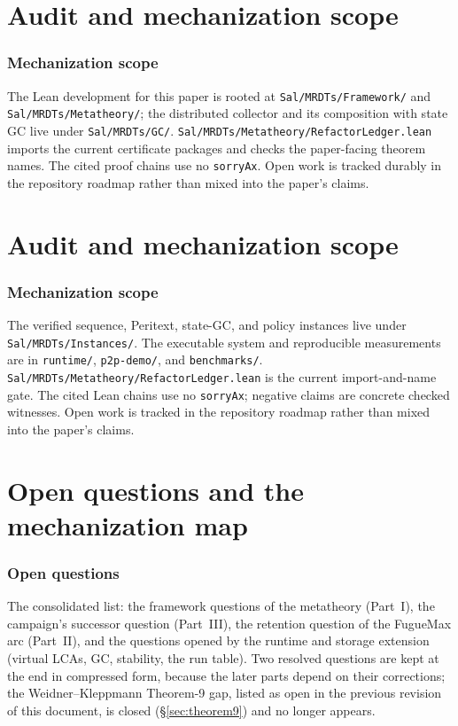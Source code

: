\documentclass[11pt]{article}
\let\salInlinePart\part
\renewcommand{\part}{\clearpage\salInlinePart}
\newcommand{\lean}[1]{\texttt{#1}}
\begin{document}
\part{Audit and mechanization scope}
\section{Mechanization scope}
\label{sec:mech}\label{sec:open}
\label{oq:causalcanon}\label{oq:compose}\label{oq:rcchain}
The Lean development for this paper is rooted at
\lean{Sal/MRDTs/Framework/} and \lean{Sal/MRDTs/Metatheory/}; the distributed
collector and its composition with state GC live under \lean{Sal/MRDTs/GC/}.
\lean{Sal/MRDTs/Metatheory/RefactorLedger.lean} imports the current certificate
packages and checks the paper-facing theorem names. The cited proof chains use
no \lean{sorryAx}. Open work is tracked durably in the repository roadmap
rather than mixed into the paper's claims.
\else\ifdefined\salPaperB
\part{Audit and mechanization scope}
\section{Mechanization scope}
\label{oq:epochdag}\label{oq:retention}\label{oq:runtable}
\label{oq:seqwitness}\label{oq:starlemma}
The verified sequence, Peritext, state-GC, and policy instances live under
\lean{Sal/MRDTs/Instances/}. The executable system and reproducible measurements
are in \lean{runtime/}, \lean{p2p-demo/}, and \lean{benchmarks/}.
\lean{Sal/MRDTs/Metatheory/RefactorLedger.lean} is the current import-and-name
gate. The cited Lean chains use no \lean{sorryAx}; negative claims are concrete
checked witnesses. Open work is tracked in the repository roadmap rather than
mixed into the paper's claims.
\else
\part{Open questions and the mechanization map}

\section{Open questions}
\label{sec:open}

The consolidated list: the framework questions of the metatheory
(Part~I), the campaign's successor question (Part~III), the retention
question of the FugueMax arc (Part~II), and the questions opened by the
runtime and storage extension (virtual LCAs, GC, stability, the run
table). Two resolved questions are kept at the end in compressed form,
because the later parts depend on their corrections; the
Weidner--Kleppmann Theorem-9 gap, listed as open in the previous
revision of this document, is closed (\S\ref{sec:theorem9}) and no
longer appears.
\end{document}
